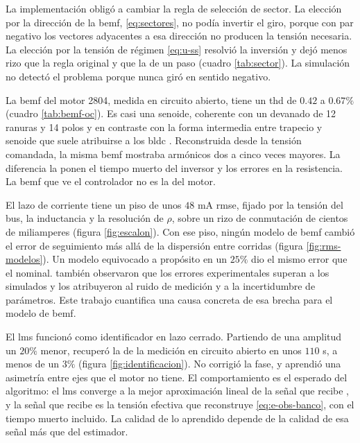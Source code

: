 \documentclass[../../../Tesis_JALS_Maestria.tex]{subfiles}
\begin{document}
La implementación obligó a cambiar la regla de selección de sector. La elección por la dirección de la \acrshort{bemf}, \eqref{eq:sectores}, no podía invertir el giro, porque con par negativo los vectores adyacentes a esa dirección no producen la tensión necesaria. La elección por la tensión de régimen \eqref{eq:u-ss} resolvió la inversión y dejó menos rizo que la regla original y que la de un paso (cuadro \ref{tab:sector}). La simulación no detectó el problema porque nunca giró en sentido negativo.

La \acrshort{bemf} del motor 2804, medida en circuito abierto, tiene un \acrshort{thd} de $0.42$ a $0.67\%$ (cuadro \ref{tab:bemf-oc}). Es casi una senoide, coherente con un devanado de 12 ranuras y 14 polos y en contraste con la forma intermedia entre trapecio y senoide que suele atribuirse a los \acrshort{bldc} \citep{shao2003direct}. Reconstruida desde la tensión comandada, la misma \acrshort{bemf} mostraba armónicos dos a cinco veces mayores. La diferencia la ponen el tiempo muerto del inversor y los errores en la resistencia. La \acrshort{bemf} que ve el controlador no es la del motor.

El lazo de corriente tiene un piso de unos $48$ mA \acrshort{rmse}, fijado por la tensión del bus, la inductancia y la resolución de $\rho$, sobre un rizo de conmutación de cientos de miliamperes (figura \ref{fig:escalon}). Con ese piso, ningún modelo de \acrshort{bemf} cambió el error de seguimiento más allá de la dispersión entre corridas (figura \ref{fig:rms-modelos}). Un modelo equivocado a propósito en un $25\%$ dio el mismo error que el nominal. \citet{coronado2025} también observaron que los errores experimentales superan a los simulados y los atribuyeron al ruido de medición y a la incertidumbre de parámetros. Este trabajo cuantifica una causa concreta de esa brecha para el modelo de \acrshort{bemf}.

El \acrshort{lms} funcionó como identificador en lazo cerrado. Partiendo de una amplitud un $20\%$ menor, recuperó la de la medición en circuito abierto en unos $110$ s, a menos de un $3\%$ (figura \ref{fig:identificacion}). No corrigió la fase, y aprendió una asimetría entre ejes que el motor no tiene. El comportamiento es el esperado del algoritmo: el \acrshort{lms} converge a la mejor aproximación lineal de la señal que recibe \citep{haykin2014adaptive}, y la señal que recibe es la tensión efectiva que reconstruye \eqref{eq:e-obs-banco}, con el tiempo muerto incluido. La calidad de lo aprendido depende de la calidad de esa señal más que del estimador.
\end{document}
